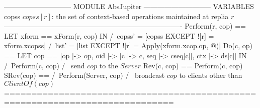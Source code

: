 \documentclass{article}
\begin{document}
\begin{tla}
----------------------------- MODULE AbsJupiter -----------------------------
VARIABLES copss \* $copss[r]$: the set of context-based operations maintained at replia $r$
----------------------------------------------------------------------------
Perform(r, cop) == LET xform == xForm(r, cop)
                   IN  /\ copss' = [copss EXCEPT ![r] = xform.xcopss]
                       /\ list' = [list EXCEPT ![r] = Apply(xform.xcop.op, @)]
Do(c, op) == LET cop == [op |-> op, oid |-> [c |-> c, seq |-> cseq[c]], ctx |-> ds[c]]
             IN  /\ Perform(c, cop)
                 /\ \* send $cop$ to the $Server$
Rev(c, cop) == Perform(c, cop)
SRev(cop) == /\ Perform(Server, cop)
             /\ \* broadcast $cop$ to clients other than $ClientOf(cop)$
=============================================================================
\end{tla}
\end{document}
